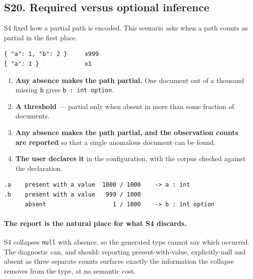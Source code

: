 \subsection*{S20. Required versus optional inference}

S4 fixed how a partial path is encoded. This scenario asks when a path counts
as partial in the first place.

\begin{lstlisting}[style=json]
{ "a": 1, "b": 2 }     x999
{ "a": 1 }             x1
\end{lstlisting}

\options
\begin{enumerate}[label=\textbf{(\alph*)}]
  \item \textbf{Any absence makes the path partial.} One document out of a
        thousand missing \texttt{b} gives \texttt{b : int option}.
  \item \textbf{A threshold} --- partial only when absent in more than some
        fraction of documents.
  \item \textbf{Any absence makes the path partial, and the observation counts
        are reported} so that a single anomalous document can be found.
        \selected
  \item \textbf{The user declares it} in the configuration, with the corpus
        checked against the declaration.
\end{enumerate}


\begin{lstlisting}[style=json]
.a    present with a value  1000 / 1000    -> a : int
.b    present with a value   999 / 1000
      absent                   1 / 1000    -> b : int option
\end{lstlisting}

\paragraph{The report is the natural place for what S4 discards.}
S4 collapses \texttt{null} with absence, so the generated type cannot say
which occurred. The diagnostic can, and should: reporting
present-with-value, explicitly-null and absent as three separate counts
surfaces exactly the information the collapse removes from the type, at no
semantic cost.

